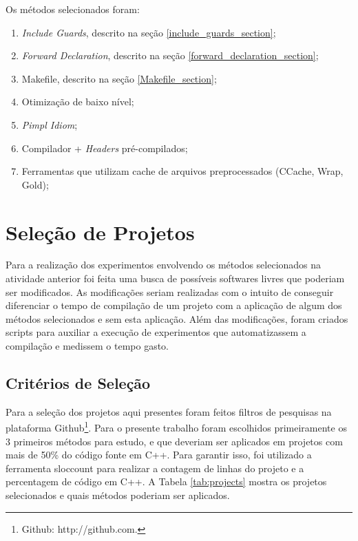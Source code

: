 Os métodos selecionados foram:

\begin{enumerate}
	\item \textit{Include Guards}, descrito na seção
 \ref{include_guards_section};
	\item \textit{Forward Declaration}, descrito na seção
 \ref{forward_declaration_section};
	\item Makefile, descrito na seção
 \ref{Makefile_section};
	\item Otimização de baixo nível;
	\item \textit{Pimpl Idiom};
	\item Compilador + \textit{Headers} pré-compilados;
	\item Ferramentas que utilizam cache de arquivos 
preprocessados (CCache, Wrap, Gold);
\end{enumerate}

\section{Seleção de Projetos}

Para a realização dos experimentos  envolvendo os métodos selecionados na
 atividade anterior foi feita uma busca de possíveis softwares livres que
 poderiam ser modificados.  As modificações seriam realizadas com o intuito
 de conseguir diferenciar o tempo de compilação de um projeto com a aplicação
 de algum dos métodos selecionados e sem  esta aplicação. Além das
 modificações, foram criados scripts para auxiliar a execução de experimentos
 que automatizassem a compilação e medissem o tempo gasto.

\subsection{Critérios de Seleção}


Para a seleção dos projetos aqui presentes foram feitos filtros de pesquisas
 na plataforma Github\footnote{Github: http://github.com.}. Para o presente
 trabalho foram escolhidos primeiramente os 3 primeiros métodos para estudo,
 e que deveriam ser aplicados em projetos com mais de 50\% do código fonte em
 C++. Para garantir isso, foi utilizado a ferramenta sloccount para realizar
 a contagem de linhas do projeto e a percentagem de código em C++.
 A Tabela \ref{tab:projects} mostra os projetos selecionados e quais métodos
 poderiam ser aplicados.

